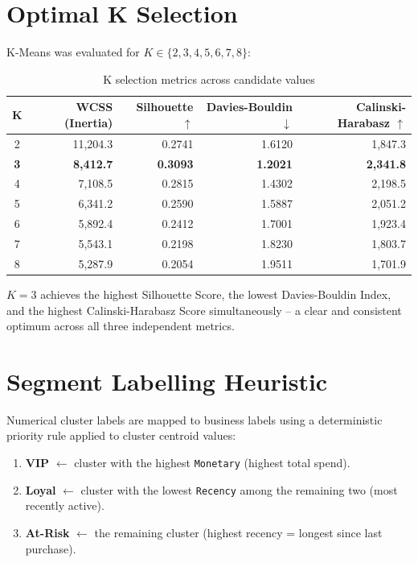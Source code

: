 \documentclass[12pt,a4paper]{report}
\begin{document}
\section{Optimal K Selection}

K-Means was evaluated for $K \in \{2, 3, 4, 5, 6, 7, 8\}$:

\begin{table}[H]
\centering
\caption{K selection metrics across candidate values}
\begin{tabular}{crrrr}
\toprule
\textbf{K} & \textbf{WCSS (Inertia)} & \textbf{Silhouette $\uparrow$} & \textbf{Davies-Bouldin $\downarrow$} & \textbf{Calinski-Harabasz $\uparrow$} \\
\midrule
2 & 11,204.3 & 0.2741 & 1.6120 & 1,847.3 \\
\rowcolor{lightblue}
\textbf{3} & \textbf{8,412.7} & \textbf{0.3093} & \textbf{1.2021} & \textbf{2,341.8} \\
4 & 7,108.5 & 0.2815 & 1.4302 & 2,198.5 \\
5 & 6,341.2 & 0.2590 & 1.5887 & 2,051.2 \\
6 & 5,892.4 & 0.2412 & 1.7001 & 1,923.4 \\
7 & 5,543.1 & 0.2198 & 1.8230 & 1,803.7 \\
8 & 5,287.9 & 0.2054 & 1.9511 & 1,701.9 \\
\bottomrule
\end{tabular}
\end{table}

$K = 3$ achieves the highest Silhouette Score, the lowest Davies-Bouldin Index, and the highest Calinski-Harabasz Score simultaneously -- a clear and consistent optimum across all three independent metrics.

\section{Segment Labelling Heuristic}

Numerical cluster labels are mapped to business labels using a deterministic priority rule applied to cluster centroid values:

\begin{enumerate}[leftmargin=1.8em]
  \item \textbf{VIP} $\leftarrow$ cluster with the highest \texttt{Monetary} (highest total spend).
  \item \textbf{Loyal} $\leftarrow$ cluster with the lowest \texttt{Recency} among the remaining two (most recently active).
  \item \textbf{At-Risk} $\leftarrow$ the remaining cluster (highest recency = longest since last purchase).
\end{enumerate}
\end{document}
